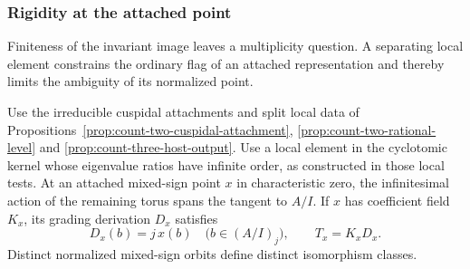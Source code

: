 \subsubsection{Rigidity at the attached point}\label{par:rigid-point}

Finiteness of the invariant image leaves a multiplicity question. A separating local element constrains the ordinary flag of an attached representation and thereby limits the ambiguity of its normalized point.

\begin{proposition}\label{prop:marked-invariant-rigidity}
Use the irreducible cuspidal attachments and split local data of
Propositions~\ref{prop:count-two-cuspidal-attachment},
\ref{prop:count-two-rational-level} and \ref{prop:count-three-host-output}.
Use a local element in the cyclotomic kernel whose eigenvalue ratios
have infinite order, as constructed in those local tests. At an attached mixed-sign point \(x\) in characteristic zero, the infinitesimal action of the remaining torus spans the tangent to \(A/I\). If \(x\) has coefficient field \(K_x\), its grading derivation \(D_x\) satisfies 
\[
 D_x(b)=j\,x(b)\quad\bigl(b\in(A/I)_j\bigr),\qquad T_x=K_xD_x.
\]
 Distinct normalized mixed-sign orbits define
distinct isomorphism classes.
\end{proposition}

